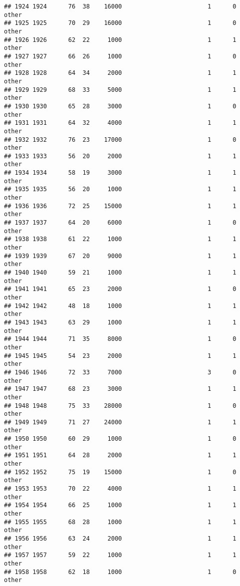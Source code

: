 \documentclass[
]{article}
\begin{document}
\begin{verbatim}
## 1924 1924      76  38    16000                        1      0    other
## 1925 1925      70  29    16000                        1      0    other
## 1926 1926      62  22     1000                        1      1    other
## 1927 1927      66  26     1000                        1      0    other
## 1928 1928      64  34     2000                        1      1    other
## 1929 1929      68  33     5000                        1      1    other
## 1930 1930      65  28     3000                        1      0    other
## 1931 1931      64  32     4000                        1      1    other
## 1932 1932      76  23    17000                        1      0    other
## 1933 1933      56  20     2000                        1      1    other
## 1934 1934      58  19     3000                        1      1    other
## 1935 1935      56  20     1000                        1      1    other
## 1936 1936      72  25    15000                        1      1    other
## 1937 1937      64  20     6000                        1      0    other
## 1938 1938      61  22     1000                        1      1    other
## 1939 1939      67  20     9000                        1      1    other
## 1940 1940      59  21     1000                        1      1    other
## 1941 1941      65  23     2000                        1      0    other
## 1942 1942      48  18     1000                        1      1    other
## 1943 1943      63  29     1000                        1      1    other
## 1944 1944      71  35     8000                        1      0    other
## 1945 1945      54  23     2000                        1      1    other
## 1946 1946      72  33     7000                        3      0    other
## 1947 1947      68  23     3000                        1      1    other
## 1948 1948      75  33    28000                        1      0    other
## 1949 1949      71  27    24000                        1      1    other
## 1950 1950      60  29     1000                        1      0    other
## 1951 1951      64  28     2000                        1      1    other
## 1952 1952      75  19    15000                        1      0    other
## 1953 1953      70  22     4000                        1      1    other
## 1954 1954      66  25     1000                        1      1    other
## 1955 1955      68  28     1000                        1      1    other
## 1956 1956      63  24     2000                        1      1    other
## 1957 1957      59  22     1000                        1      1    other
## 1958 1958      62  18     1000                        1      0    other

\end{verbatim}
\end{document}

